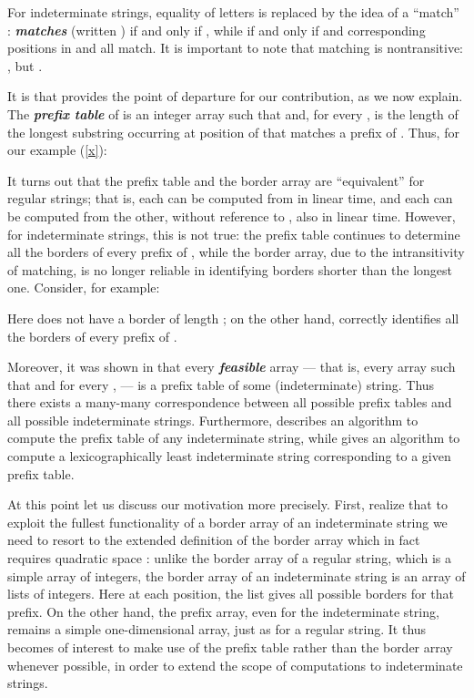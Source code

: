 \documentclass[runningheads,a4paper]{llncs}
\def\s#1{\mbox{\boldmath }}
\def\itbf#1{\textit{\textbf{#1}}}
\begin{document}
For indeterminate strings, equality of letters
is replaced by the idea of a ``match'' \cite{HS03}:
 \itbf{matches} 
(written ) if and only if
,
while  if and only if
 and corresponding positions in
\s{x} and \s{y} all match.
It is important to note that matching is nontransitive:
, but .

It is \cite{CRSW13} that provides the point of departure for our contribution,
as we now explain.
The \itbf{prefix table}  of  is an
integer array such that  and,
for every ,  is the length of the longest substring
occurring at position  of \s{x} that matches a prefix of \s{x}.
Thus, for our example (\ref{x}):

 

It turns out \cite{BKS13} that the prefix table and the border array
are ``equivalent'' for regular strings; that is,
each can be computed from \s{x} in linear time,
and each can be computed from the other,
without reference to \s{x}, also in linear time.
However, for indeterminate strings, this is not true:
the prefix table
continues to determine all the borders of every prefix of \s{x},
while the border array, due to the intransitivity of matching,
is no longer reliable in identifying borders shorter than the longest one.
Consider, for example:



Here \s{x} does not have a border of length ;
on the other hand,  correctly identifies
all the borders of every prefix of \s{x}.



Moreover, it was shown in \cite{CRSW13} that every \itbf{feasible} array --- that is,
every array  such that 
and for every ,  --- is a
prefix table of some (indeterminate) string.
Thus there exists a many-many correspondence between all possible
prefix tables and all possible indeterminate strings.
Furthermore, \cite{SW08} describes an algorithm to compute
the prefix table of any indeterminate string,
while \cite{ARS14} gives an algorithm to compute a
lexicographically least indeterminate string
corresponding to a given prefix table.

At this point let us discuss our motivation more precisely. First,
realize that to exploit the fullest functionality of a border array of an
indeterminate string we need to resort to the extended definition of the border
array which in fact requires quadratic space \cite{HS03,NRR12,BRS09}:
unlike the border array of a regular string, which is a simple array of
integers, the border array of an indeterminate string is an array of lists of
integers. Here at each position, the list gives all possible borders for that
prefix. On the other hand, the prefix array, even for the indeterminate string,
remains a simple one-dimensional array, just as for a regular string. It thus
becomes of interest to make use of the prefix table rather than the border array
whenever possible, in order to extend the scope of computations to indeterminate
strings.
\end{document}
